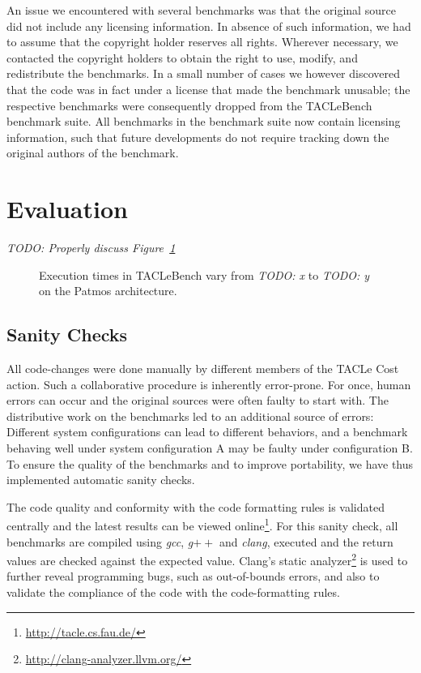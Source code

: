 \documentclass[a4paper,UKenglish]{oasics}
\newcommand{\todo}[1]{{\emph{TODO: #1}}}
\begin{document}
An issue we encountered with several benchmarks was that the original
source did not include any licensing information. In absence of such
information, we had to assume that the copyright holder reserves all
rights. Wherever necessary, we contacted the copyright holders to
obtain the right to use, modify, and redistribute the benchmarks. In a
small number of cases we however discovered that the code was in fact
under a license that made the benchmark unusable; the respective
benchmarks were consequently dropped from the TACLeBench benchmark
suite. All benchmarks in the benchmark suite now contain licensing
information, such that future developments do not require tracking
down the original authors of the benchmark.

\section{Evaluation}
\label{sec:eval}


\todo{Properly discuss Figure~\ref{fig:execution-times}}
\begin{figure}[t]
  \def\resultfile{eval/wcet.csv}
  
  \caption{Execution times in TACLeBench vary from \todo{x} to \todo{y} on the Patmos architecture.}
  \label{fig:execution-times}
\end{figure}

\subsection{Sanity Checks}
All code-changes were done manually by different members of the TACLe Cost action.
Such a collaborative procedure is inherently error-prone.
For once, human errors can occur and the original sources were often faulty to start with.
The distributive work on the benchmarks led to an additional source of errors:
Different system configurations can lead to different behaviors, and a benchmark behaving well under system configuration A may be faulty under configuration B.
To ensure the quality of the benchmarks and to improve portability, we have thus implemented automatic sanity checks.

The code quality and conformity with the code formatting rules is validated centrally and the latest results can be viewed online\footnote{\url{http://tacle.cs.fau.de/}}.
For this sanity check, all benchmarks are compiled using \textit{gcc}, \textit{g$++$} and \textit{clang}, executed and the return values are checked against the expected value.
Clang's static analyzer\footnote{\url{http://clang-analyzer.llvm.org/}} is used to further reveal programming bugs, such as out-of-bounds errors, and also to validate the compliance of the code with the code-formatting rules.
\end{document}
